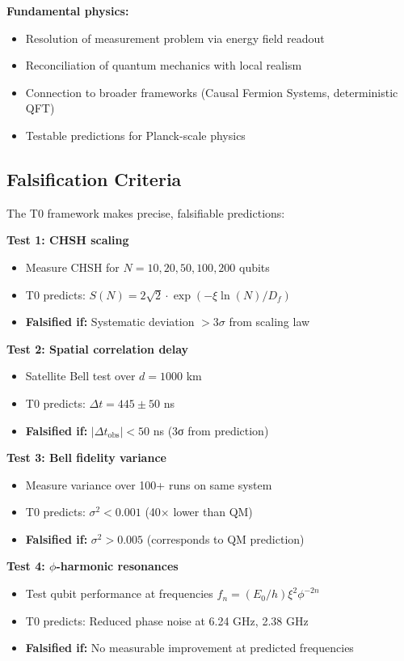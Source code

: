 \textbf{Fundamental physics:}
\begin{itemize}
	\item Resolution of measurement problem via energy field readout
	\item Reconciliation of quantum mechanics with local realism
	\item Connection to broader frameworks (Causal Fermion Systems, deterministic QFT)
	\item Testable predictions for Planck-scale physics
\end{itemize}

\subsection{Falsification Criteria}

The T0 framework makes precise, falsifiable predictions:

\begin{experimentbox}
	\textbf{Test 1: CHSH scaling}
	\begin{itemize}
		\item Measure CHSH for $N = 10, 20, 50, 100, 200$ qubits
		\item T0 predicts: $S(N) = 2\sqrt{2} \cdot \exp(-\xi \ln(N)/D_f)$
		\item \textbf{Falsified if:} Systematic deviation $> 3\sigma$ from scaling law
	\end{itemize}
	
	\textbf{Test 2: Spatial correlation delay}
	\begin{itemize}
		\item Satellite Bell test over $d = 1000$ km
		\item T0 predicts: $\Delta t = 445 \pm 50$ ns
		\item \textbf{Falsified if:} $|\Delta t_{\text{obs}}| < 50$ ns (3σ from prediction)
	\end{itemize}
	
	\textbf{Test 3: Bell fidelity variance}
	\begin{itemize}
		\item Measure variance over 100+ runs on same system
		\item T0 predicts: $\sigma^2 < 0.001$ (40× lower than QM)
		\item \textbf{Falsified if:} $\sigma^2 > 0.005$ (corresponds to QM prediction)
	\end{itemize}
	
	\textbf{Test 4: $\phi$-harmonic resonances}
	\begin{itemize}
		\item Test qubit performance at frequencies $f_n = (E_0/h) \xi^2 \phi^{-2n}$
		\item T0 predicts: Reduced phase noise at 6.24 GHz, 2.38 GHz
		\item \textbf{Falsified if:} No measurable improvement at predicted frequencies
	\end{itemize}
\end{experimentbox}

